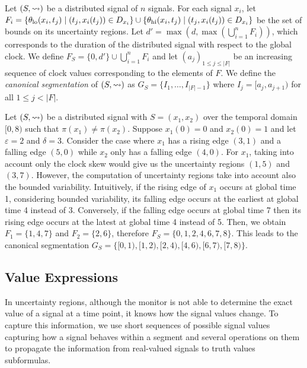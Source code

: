 Let $(S,{\rightsquigarrow})$ be a distributed signal of $n$ signals.
For each signal $x_i$, let $F_i = \{\theta_{\text{lo}}(x_i, t_j) \st (t_j, x_i(t_j)) \in D_{x_i}\} \cup \{\theta_{\text{hi}}(x_i, t_j) \st (t_j, x_i(t_j)) \in D_{x_i}\}$ be the set of bounds on its uncertainty regions.
Let $d' = \max(d, \max (\bigcup_{i = 1}^{n} F_i))$, which corresponds to the duration of the distributed signal with respect to the global clock.
We define $F_S = \{0, d'\} \cup \bigcup_{i = 1}^{n} F_i$ and let $(a_j)_{1 \leq j \leq |F|}$ be an increasing sequence of clock values corresponding to the elements of $F$.
We define the \emph{canonical segmentation} of $(S,{\rightsquigarrow})$ as $G_S = \{I_1, \ldots, I_{|F| - 1}\}$ where $I_j = [a_j, a_{j+1})$ for all $1 \leq j < |F|$.

\begin{example} \label{ex:canonseg}
	Let $(S, {\rightsquigarrow})$ be a distributed signal with $S = (x_1, x_2)$ over the temporal domain $[0,8)$ such that $\pi(x_1) \neq \pi(x_2)$.
	Suppose $x_1(0) = 0$ and $x_2(0) = 1$ and let $\varepsilon = 2$ and $\delta = 3$.	
	Consider the case where $x_1$ has a rising edge $(3,1)$ and a falling edge $(5,0)$ while $x_2$ only has a falling edge $(4,0)$.
	For $x_1$, taking into account only the clock skew would give us the uncertainty regions $(1,5)$ and $(3,7)$.
	However, the computation of uncertainty regions take into account also the bounded variability.
	Intuitively, if the rising edge of $x_1$ occurs at global time 1, considering bounded variability, its falling edge occurs at the earliest at global time 4 instead of 3.
	Conversely, if the falling edge occurs at global time 7 then its rising edge occurs at the latest at global time 4 instead of 5.
	Then, we obtain $F_1 = \{1, 4, 7\}$ and $F_2 = \{2, 6\}$, therefore $F_S = \{0, 1, 2, 4, 6, 7, 8\}$.
	This leads to the canonical segmentation $G_S = \{[0,1), [1,2) ,[2,4) ,[4,6) ,[6,7) ,[7,8)\}$.		
\end{example}

\subsection{Value Expressions}
In uncertainty regions, although the monitor is not able to determine the exact value of a signal at a time point, it knows how the signal values change.
To capture this information, we use short sequences of possible signal values capturing how a signal behaves within a segment and several operations on them to propagate the information from real-valued signals to truth values subformulas.


